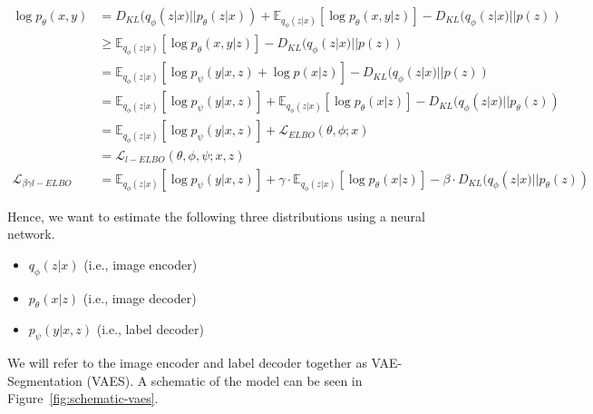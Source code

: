 \begin{subequations}
    \begin{align}
        \log p_\theta(x, y)
         & = D_{KL}(q_\phi(z|x) || p_\theta(z|x)) + \mathbb{E}_{q_{\phi}(z | x)}[\log p_\theta(x, y | z)] - D_{KL}(q_{\phi}(z|x) || p(z))  \label{eq:p_x_y_rewrite}                                                \\
         & \geq \mathbb{E}_{q_{\phi}(z | x)}[\log p_\theta(x, y | z)] - D_{KL}(q_{\phi}(z|x) || p(z))                                                                                                              \\
         & = \mathbb{E}_{q_{\phi}(z | x)}[\log p_\psi(y | x, z) + \log p(x | z)] - D_{KL}(q_{\phi}(z|x) || p(z))                                                                                                   \\
         & = \mathbb{E}_{q_{\phi}(z | x)}[\log p_\psi(y | x, z)] + \mathbb{E}_{q_{\phi}(z | x)}[\log p_\theta(x | z)] - D_{KL}(q_{\phi}(z|x) || p_\theta(z))                                                       \\
         & = \mathbb{E}_{q_{\phi}(z | x)}[\log p_\psi(y | x, z)] + \mathcal{L}_{ELBO}(\theta, \phi; x)                                                                                                             \\
         & = \mathcal{L}_{l-ELBO} \label{eq:label_ELBO}(\theta, \phi, \psi; x, z)                                                                                                                                  \\
        \mathcal{L}_{\beta\gamma l-ELBO}
         & = \mathbb{E}_{q_{\phi}(z | x)}[\log p_\psi(y | x, z)] + \gamma \cdot \mathbb{E}_{q_{\phi}(z | x)}[\log p_\theta(x | z)] - \beta \cdot D_{KL}(q_{\phi}(z|x) || p_\theta(z))        \label{eq:beta_label}
    \end{align}
\end{subequations}

Hence, we want to estimate the following three distributions using a neural network.
\begin{itemize}
    \item $q_\phi(z|x)$ (i.e., image encoder)
    \item $p_\theta(x|z)$ (i.e., image decoder)
    \item $p_\psi(y|x, z)$ (i.e., label decoder)
\end{itemize}
We will refer to the image encoder and label decoder together as VAE-Segmentation (VAES). A schematic of the model can be seen in Figure~\ref{fig:schematic-vaes}.


